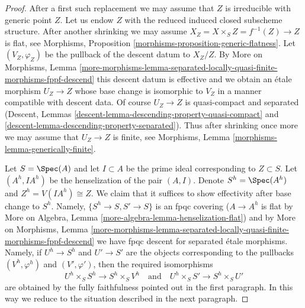 \begin{proof}
\medskip\noindent
After a first such replacement we may assume that $Z$ is irreducible
with generic point $Z$. Let us endow $Z$ with the reduced induced
closed subscheme structure. After another shrinking we may assume
$X_Z = X \times_S Z = f^{-1}(Z) \to Z$ is flat, see
Morphisms, Proposition \ref{morphisms-proposition-generic-flatness}.
Let $(V_Z, \varphi_Z)$ be the pullback of the descent datum to $X_Z/Z$.
By More on Morphisms, Lemma
\ref{more-morphisms-lemma-separated-locally-quasi-finite-morphisms-fppf-descend}
this descent datum is effective and we obtain an \'etale morphism
$U_Z \to Z$ whose base change is isomorphic to $V_Z$ in a manner
compatible with descent data.
Of course $U_Z \to Z$ is quasi-compact and separated
(Descent, Lemmas \ref{descent-lemma-descending-property-quasi-compact} and
\ref{descent-lemma-descending-property-separated}).
Thus after shrinking once more we may assume
that $U_Z \to Z$ is finite, see
Morphisms, Lemma \ref{morphisms-lemma-generically-finite}.

\medskip\noindent
Let $S = \Spec(A)$ and let $I \subset A$ be the prime ideal corresponding
to $Z \subset S$. Let $(A^h, IA^h)$ be the henselization of the pair
$(A, I)$. Denote $S^h = \Spec(A^h)$ and $Z^h = V(IA^h) \cong Z$.
We claim that it suffices to show effectivity after base change to
$S^h$. Namely, $\{S^h \to S, S' \to S\}$ is an fpqc covering
($A \to A^h$ is flat by More on Algebra, Lemma
\ref{more-algebra-lemma-henselization-flat}) and
by More on Morphisms, Lemma
\ref{more-morphisms-lemma-separated-locally-quasi-finite-morphisms-fppf-descend}
we have fpqc descent for separated \'etale morphisms.
Namely, if $U^h \to S^h$ and $U' \to S'$ are the objects
corresponding to the pullbacks $(V^h, \varphi^h)$ and
$(V', \varphi')$, then the required isomorphisms
$$
U^h \times_S S^h \to S^h \times_S V^h
\quad\text{and}\quad
U^h \times_S S' \to S^h \times_S U'
$$
are obtained by the fully faithfulness pointed out in the first
paragraph. In this way we reduce to the situation described in
the next paragraph.


\end{proof}
